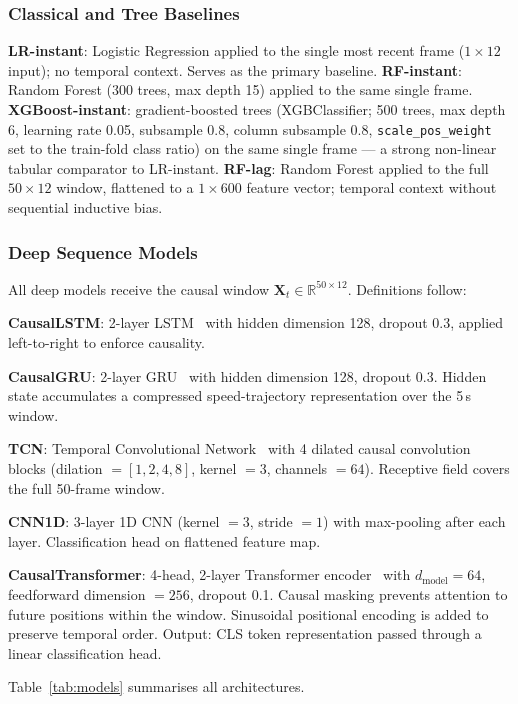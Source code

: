 \documentclass[conference,a4paper]{IEEEtran}
\begin{document}
\subsubsection{Classical and Tree Baselines}
\textbf{LR-instant}: Logistic Regression applied to the single most recent frame
($1 \times 12$ input); no temporal context. Serves as the primary baseline.
\textbf{RF-instant}: Random Forest (300 trees, max depth 15) applied to the same single frame.
\textbf{XGBoost-instant}: gradient-boosted trees (XGBClassifier; 500 trees, max depth 6,
learning rate 0.05, subsample 0.8, column subsample 0.8, \texttt{scale\_pos\_weight} set to
the train-fold class ratio) on the same single frame — a strong non-linear tabular
comparator to LR-instant.
\textbf{RF-lag}: Random Forest applied to the full $50 \times 12$ window, flattened
to a $1 \times 600$ feature vector; temporal context without sequential inductive bias.

\subsubsection{Deep Sequence Models}
All deep models receive the causal window $\mathbf{X}_t \in \mathbb{R}^{50 \times 12}$.
Definitions follow:

\textbf{CausalLSTM}: 2-layer LSTM~\cite{ref_lstm} with hidden dimension 128, dropout 0.3,
applied left-to-right to enforce causality.

\textbf{CausalGRU}: 2-layer GRU~\cite{ref_gru} with hidden dimension 128, dropout 0.3.
Hidden state accumulates a compressed speed-trajectory representation over the 5\,s window.

\textbf{TCN}: Temporal Convolutional Network~\cite{ref_tcn} with 4 dilated causal
convolution blocks (dilation $= [1, 2, 4, 8]$, kernel $= 3$, channels $= 64$).
Receptive field covers the full 50-frame window.

\textbf{CNN1D}: 3-layer 1D CNN (kernel $= 3$, stride $= 1$) with max-pooling after
each layer. Classification head on flattened feature map.

\textbf{CausalTransformer}: 4-head, 2-layer Transformer encoder~\cite{ref_attention}
with $d_{\text{model}} = 64$, feedforward dimension $= 256$, dropout 0.1.
Causal masking prevents attention to future positions within the window.
Sinusoidal positional encoding is added to preserve temporal order.
Output: CLS token representation passed through a linear classification head.

Table~\ref{tab:models} summarises all architectures.
\end{document}
